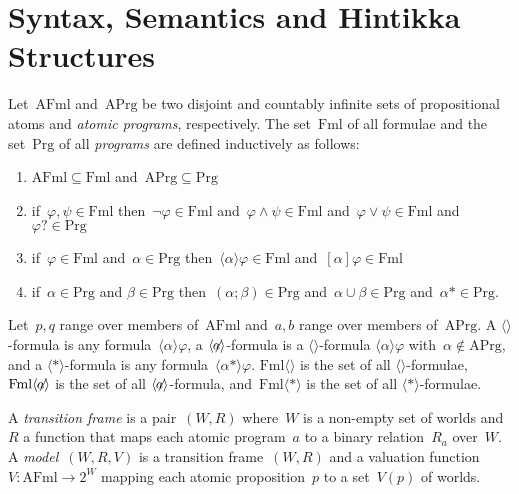 \documentclass{entcs}
\newcommand{\pnot}[1]{\lnot #1}
\newcommand{\pand}[2]{#1 \land #2}
\newcommand{\por}[2]{#1 \lor #2}
\newcommand{\pea}[2]{\langle#1\rangle #2}
\newcommand{\paa}[2]{[#1] #2}
\newcommand{\psp}[2]{#1;#2}
\newcommand{\pup}[2]{#1\cup#2}
\newcommand{\prp}[1]{#1*}
\newcommand{\pip}[1]{#1?}
\newcommand{\fml}{\mathrm{Fml}}
\newcommand{\prg}{\mathrm{Prg}}
\newcommand{\proptn}{\mathrm{AFml}}
\newcommand{\act}{\mathrm{APrg}}
\newcommand{\fea}{$\pea{}{}$}
\newcommand{\fean}{$\pea{\not\!\!a}{}$}
\newcommand{\fear}{$\pea{\prp{}}{}$}
\newcommand{\fmlea}{\mathrm{Fml}\pea{}{}}
\newcommand{\fmlean}{\mathrm{Fml}\pea{\not\!\!a}{}}
\newcommand{\fmler}{\mathrm{Fml}\pea{\prp{}}{}}
\begin{document}
\section{Syntax, Semantics and Hintikka Structures}

\begin{definition}
  Let~$\proptn$ and~$\act$ be two disjoint and countably infinite sets of propositional atoms
  and \emph{atomic programs}, respectively.
  The set~$\fml$ of all formulae and the set~$\prg$ of all \emph{programs}
  are defined inductively as follows:
  \begin{enumerate}
  \item $\proptn \subseteq \fml$ and~$\act \subseteq \prg$
  \item if~$\varphi, \psi \in \fml$ then~$\pnot{\varphi} \in \fml$
    and~$\pand{\varphi}{\psi} \in \fml$ and~$\por{\varphi}{\psi} \in \fml$ and~$\pip{\varphi} \in \prg$
  \item if~$\varphi \in \fml$ and~$\alpha \in \prg$ then~$\pea{\alpha}{\varphi}\in \fml$ and~$\paa{\alpha}{\varphi} \in \fml$
  \item if~$\alpha \in \prg$ and $\beta \in \prg$ then~$(\psp{\alpha}{\beta}) \in \prg$ and~$\pup{\alpha}{\beta} \in \prg$ and~$\prp{\alpha} \in \prg$.
  \end{enumerate}
  Let~$p, q$ range over members of~$\proptn$
  and~$a, b$ range over members of~$\act$.
  A \fea{}-formula is any formula~$\pea{\alpha}{\varphi}$,
  a \fean{}-formula is a \fea{}-formula 
  $\pea{\alpha}{\varphi}$ with~$\alpha \notin \act$,
  and a \fear{}-formula is any formula~$\pea{\prp{\alpha}}{\varphi}$.
  $\fmlea$ is the set of all \fea{}-formulae,
  $\fmlean$ is the set of all \fean{}-formula,
  and~$\fmler$ is the set of all \fear{}-formulae.
\end{definition}

\begin{definition}
  A \emph{transition frame} is a pair~$(W,R)$
  where~$W$ is a non-empty set of worlds and~$R$ a function
  that maps each atomic program~$a$ to a binary relation~$R_a$ over~$W$.
  A \emph{model}~$(W,R,V)$ is a transition frame~$(W,R)$
  and a valuation function~$V: \proptn \to 2^W$
  mapping each atomic proposition~$p$ to
  a set~$V(p)$ of worlds.
\end{definition}
\end{document}
